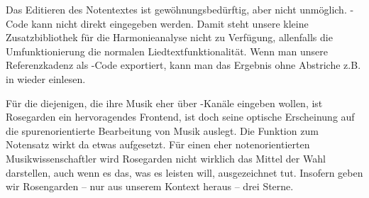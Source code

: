 Das Editieren des Notentextes ist gewöhnungsbedürftig, aber nicht unmöglich.
-Code kann nicht direkt eingegeben werden. Damit steht unsere
kleine Zusatzbibliothek für die Harmonieanalyse nicht zu Verfügung, allenfalls
die Umfunktionierung die normalen Liedtextfunktionalität. Wenn man unsere
Referenzkadenz als -Code exportiert, kann man das Ergebnis ohne
Abstriche z.B. in  wieder einlesen.

Für die diejenigen, die ihre Musik eher über -Kanäle eingeben wollen,
ist Rosegarden ein hervoragendes Frontend, ist doch seine optische Erscheinung
auf die spurenorientierte Bearbeitung von Musik auslegt. Die Funktion zum
Notensatz wirkt da etwas aufgesetzt. Für einen eher notenorientierten
Musikwissenschaftler wird Rosegarden nicht wirklich das Mittel der Wahl darstellen,
auch wenn es das, was es leisten will, ausgezeichnet tut. Insofern geben wir 
Rosengarden -- nur aus unserem Kontext heraus -- drei Sterne.


%
